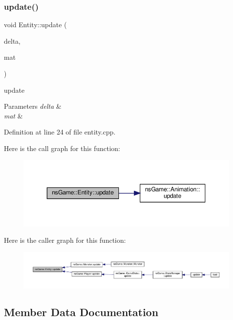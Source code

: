 \subsubsection{\texorpdfstring{update()}{update()}}
{\footnotesize\ttfamily void Entity\+::update (\begin{DoxyParamCaption}\item[{unsigned}]{delta,  }\item[{\hyperlink{type_8h_a64a592133575ccebb1b36453acbec02b}{C\+Mat} \&}]{mat }\end{DoxyParamCaption})}



update 


\begin{DoxyParams}{Parameters}
{\em delta} & \\
\hline
{\em mat} & \\
\hline
\end{DoxyParams}


Definition at line 24 of file entity.\+cpp.

Here is the call graph for this function\+:\nopagebreak
\begin{figure}[H]
\begin{center}
\leavevmode
\includegraphics[width=345pt]{structns_game_1_1_entity_af1da5da20798e01469c4a438d0b4174c_cgraph}
\end{center}
\end{figure}
Here is the caller graph for this function\+:\nopagebreak
\begin{figure}[H]
\begin{center}
\leavevmode
\includegraphics[width=350pt]{structns_game_1_1_entity_af1da5da20798e01469c4a438d0b4174c_icgraph}
\end{center}
\end{figure}


\subsection{Member Data Documentation}
\mbox{\label{structns_game_1_1_entity_a3b26c2bf34732b4621932ab7d50421e9}} 
